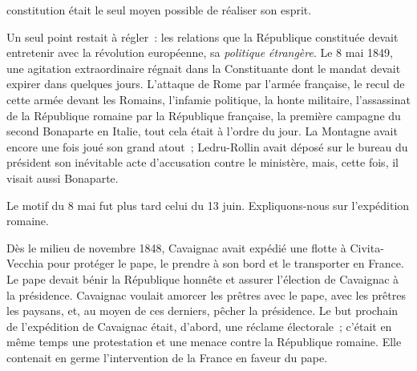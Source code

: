 \documentclass[twoside]{book} %
\begin{document}
constitution était le seul moyen possible de réaliser son esprit.\par
Un seul point restait à régler : les relations que la République constituée devait entretenir avec la révolution européenne, sa \emph{politique étrangère}. Le 8 mai 1849, une agitation extraordinaire régnait dans la Constituante dont le mandat devait expirer dans quelques jours. L’attaque de Rome par l’armée française, le recul de cette armée devant les Romains, l’infamie politique, la honte militaire, l’assassinat de la République romaine par la République française, la première campagne du second Bonaparte en Italie, tout cela était à l’ordre du jour. La Montagne avait encore une fois joué son grand atout ; Ledru-Rollin avait déposé sur le bureau du président son inévitable acte d’accusation contre le ministère, mais, cette fois, il visait aussi Bonaparte.\par
Le motif du 8 mai fut plus tard celui du 13 juin. Expliquons-nous sur l’expédition romaine.\par
Dès le milieu de novembre 1848, Cavaignac avait expédié une flotte à Civita-Vecchia pour protéger le pape, le prendre à son bord et le transporter en France. Le pape devait bénir la République honnête et assurer l’élection de Cavaignac à la présidence. Cavaignac voulait amorcer les prêtres avec le pape, avec les prêtres les paysans, et, au moyen de ces derniers, pêcher la présidence. Le but prochain de l’expédition de Cavaignac était, d’abord, une réclame électorale ; c’était en même temps une protestation et une menace contre la République romaine. Elle contenait en germe l’intervention de la France en faveur du pape.\par
\end{document}
